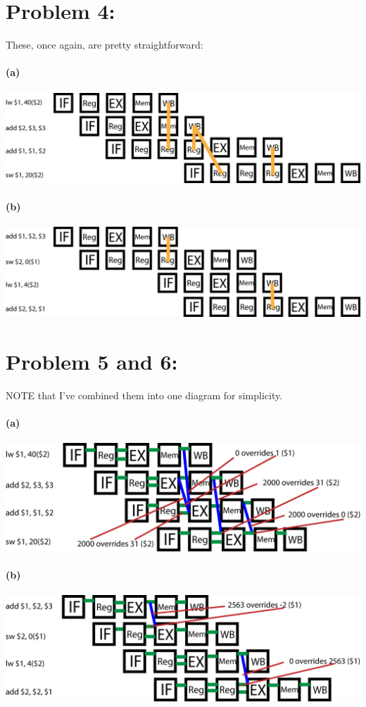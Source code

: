 \documentclass[a4paper]{article}
\begin{document}
\section{Problem 4:}

These, once again, are pretty straightforward:

\paragraph{(a) \\} \includegraphics[width=150mm]{p4_a.png}

\paragraph{(b) \\} \includegraphics[width=150mm]{p4_b.png}

\section{Problem 5 and 6:}

NOTE that I've combined them into one diagram for simplicity.

\paragraph{(a) \\} \includegraphics[width=150mm]{p5_a.png}

\paragraph{(b) \\} \includegraphics[width=150mm]{p5_b.png}
\end{document}
